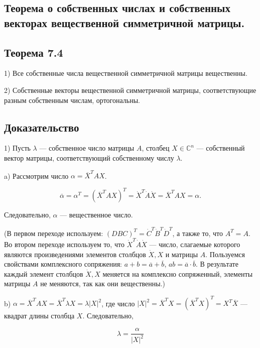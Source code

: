 {
\subsection{Теорема о собственных числах и собственных векторах вещественной симметричной матрицы.}
\subsection*{Теорема 7.4}

1) Все собственные числа вещественной симметричной матрицы вещественны.

2) Собственные векторы вещественной симметричной матрицы, соответствующие разным собственным числам, ортогональны.

\subsection*{Доказательство}

1) Пусть \( \lambda \) — собственное число матрицы \( A \), столбец \( X \in \mathbb{C}^n \) — собственный вектор матрицы, соответствующий собственному числу \( \lambda \).

a) Рассмотрим число \( \alpha = \overline{X}^T A X \).



\[
\overline{\alpha} = \alpha^T = (\overline{X}^T A X)^T = \dot{X}^T \dot{A} \dot{X} = \overline{X}^T A X = \alpha.
\]



Следовательно, \( \alpha \) — вещественное число.

(В первом переходе используем: \( (DBC)^T = \dot{C}^T \dot{B}^T \dot{D}^T \), а также то, что \( A^T = A \). Во втором переходе используем то, что \( \dot{X}^T \dot{A} \dot{X} \) — число, слагаемые которого являются произведениями элементов столбцов \( \dot{X}, X \) и матрицы \( A \). Пользуемся свойствами комплексного сопряжения: \( a + b = \overline{a} + \overline{b} \), \( ab = \overline{a} \cdot \overline{b} \). В результате каждый элемент столбцов \( \dot{X}, X \) меняется на комплексно сопряженный, элементы матрицы \( A \) не меняются, так как они вещественны.)

b) \( \alpha = \overline{X}^T A X = \overline{X}^T \lambda X = \lambda |X|^2 \), где число \( |X|^2 = \overline{X}^T X = (\overline{X}^T {X})^T = {X}^T \overline{X} \) — квадрат длины столбца \( X \). Следовательно,



\[
\lambda = \frac{\alpha}{|X|^2}
\]



}
